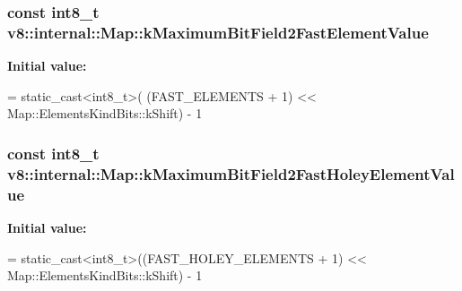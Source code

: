 \subsubsection[{\texorpdfstring{k\+Maximum\+Bit\+Field2\+Fast\+Element\+Value}{kMaximumBitField2FastElementValue}}]{\setlength{\rightskip}{0pt plus 5cm}const int8\+\_\+t v8\+::internal\+::\+Map\+::k\+Maximum\+Bit\+Field2\+Fast\+Element\+Value\hspace{0.3cm}{\ttfamily [static]}}\hypertarget{classv8_1_1internal_1_1_map_a6ac920c0f1bde8b4b6bb83c2ada337d8}{}\label{classv8_1_1internal_1_1_map_a6ac920c0f1bde8b4b6bb83c2ada337d8}
{\bfseries Initial value\+:}
\begin{DoxyCode}
= \textcolor{keyword}{static\_cast<}int8\_t\textcolor{keyword}{>}(
      (FAST\_ELEMENTS + 1) << Map::ElementsKindBits::kShift) - 1
\end{DoxyCode}
\subsubsection[{\texorpdfstring{k\+Maximum\+Bit\+Field2\+Fast\+Holey\+Element\+Value}{kMaximumBitField2FastHoleyElementValue}}]{\setlength{\rightskip}{0pt plus 5cm}const int8\+\_\+t v8\+::internal\+::\+Map\+::k\+Maximum\+Bit\+Field2\+Fast\+Holey\+Element\+Value\hspace{0.3cm}{\ttfamily [static]}}\hypertarget{classv8_1_1internal_1_1_map_a11db99b6b39703668e4a5e184ba80d34}{}\label{classv8_1_1internal_1_1_map_a11db99b6b39703668e4a5e184ba80d34}
{\bfseries Initial value\+:}
\begin{DoxyCode}
=
      \textcolor{keyword}{static\_cast<}int8\_t\textcolor{keyword}{>}((FAST\_HOLEY\_ELEMENTS + 1) <<
                          Map::ElementsKindBits::kShift) - 1
\end{DoxyCode}
